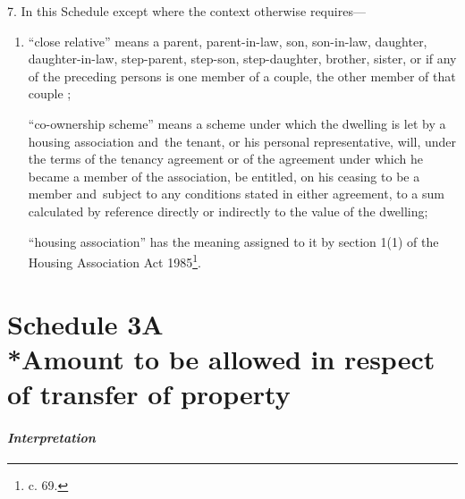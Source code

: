 \documentclass[12pt,a4paper]{article}
\begin{document}
7.  In this Schedule except where the context otherwise requires—
\begin{enumerate}\item[]
“close relative” means a parent, parent-in-law, son, son-in-law, daughter, daughter-in-law, step-parent, step-son, step-daughter, brother, sister, 
or if any of the preceding persons is one member of a couple, the other member of that couple%
;

“co-ownership scheme” means a scheme under which the dwelling is let by a housing association and~the tenant, or his personal representative, will, under the terms of the tenancy agreement or of the agreement under which he became a member of the association, be entitled, on his ceasing to be a member and~subject to any conditions stated in either agreement, to a sum calculated by reference directly or indirectly to the value of the dwelling;

“housing association” has the meaning assigned to it by section 1(1) of the Housing Association Act 1985\footnote{ c. 69.}.
\end{enumerate}


\part[Schedule 3A --- Amount to be allowed in respect of transfer of property]{Schedule 3A\\*Amount to be allowed in respect of transfer of property}

\renewcommand\parthead{--- Schedule 3A}


\subsection*{\itshape Interpretation}
\end{document}
